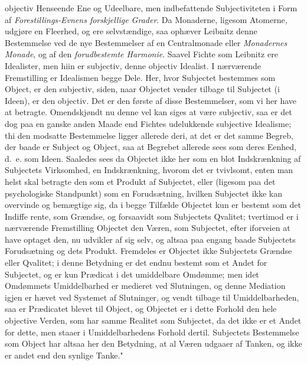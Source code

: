 \documentclass[12pt]{book}
\newcommand{\opage}[1]{\marginnote{\footnotesize\textit{[#1]}}}
\begin{document}
objectiv Henseende Ene og Udeelbare, men indbefattende Subjectiviteten i Form af
\emph{Forestillings-Evnens forskjellige Grader}. Da Monaderne, ligesom
Atomerne, udgjøre en Fleerhed, og ere selvstændige, saa ophæver Leibnitz denne
Bestemmelse ved de nye Bestemmelser af en Centralmonade eller \emph{Monadernes
Monade}, og af den \emph{forudbestemte Harmonie}. Saavel Fichte som Leibnitz ere
Idealister, men hiin er subjectiv, denne objectiv Idealist. I nærværende
Fremstilling er Idealismen begge Dele. Her, hvor Subjectet bestemmes som Object,
er den subjectiv, siden, naar Objectet vender tilbage til Subjectet (i Ideen),
er den objectiv. Det er den første af disse Bestemmelser, som vi her have at
betragte. Omendskjøndt nu denne vel kan siges at være subjectiv, saa er det dog
paa en ganske anden Maade end Fichtes udelukkende subjective Idealisme; thi den
modsatte Bestemmelse ligger allerede deri, at det er det samme Begreb, der baade
er Subject og Object, saa at Begrebet allerede sees som deres Eenhed, d.~e. som
Ideen. Saaledes sees da Objectet ikke her som en blot Indskrænkning af Subjectets
Virksomhed, en Indskrænkning, hvorom det er tvivlsomt, enten man helst skal
betragte den som et Produkt af Subjectet, eller (ligesom paa det psychologiske
Standpunkt) som en Forudsætning, hvilken Subjectet ikke kan overvinde og
bemægtige sig, da i begge Tilfælde Objectet kun er bestemt som det Indiffe%
\opage{39} rente, som Grændse, og forsaavidt som Subjectets Qvalitet; tvertimod er i
nærværende Fremstilling Objectet den Væren, som Subjectet, efter iforveien at
have optaget den, nu udvikler af sig selv, og altsaa paa engang baade Subjectets
Forudsætning og dets Produkt. Fremdeles er Objectet ikke Subjectets Grændse
eller Qvalitet; i denne Betydning er det endnu bestemt som et Andet for
Subjectet, og er kun Prædicat i det umiddelbare Omdømme; men idet Omdømmets
Umiddelbarhed er medieret ved Slutningen, og denne Mediation igjen er hævet ved
Systemet af Slutninger, og vendt tilbage til Umiddelbarheden, saa er Prædicatet
blevet til Object, og Objectet er i dette Forhold den hele objective Verden, som
har samme Realitet som Subjectet, da det ikke er et Andet for dette, men staaer
i Umiddelbarhedens Forhold dertil. Subjectets Bestemmelse som Object har altsaa
her den Betydning, at al Væren udgaaer af Tanken, og ikke er andet end den
synlige Tanke."
\end{document}
